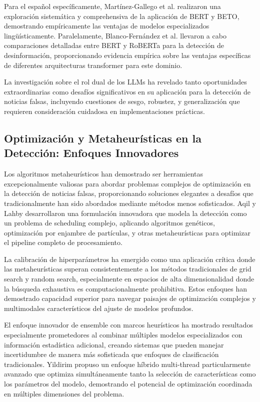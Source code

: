 Para el español específicamente, Martínez-Gallego et al. \cite{martinez2021fake} realizaron una exploración sistemática y comprehensiva de la aplicación de BERT y BETO, demostrando empíricamente las ventajas de modelos especializados lingüísticamente. Paralelamente, Blanco-Fernández et al. \cite{blanco2024enhancing} llevaron a cabo comparaciones detalladas entre BERT y RoBERTa para la detección de desinformación, proporcionando evidencia empírica sobre las ventajas específicas de diferentes arquitecturas transformer para este dominio.

La investigación sobre el rol dual de los LLMs \cite{hu2024bad, su2023adapting, su2023fake} ha revelado tanto oportunidades extraordinarias como desafíos significativos en su aplicación para la detección de noticias falsas, incluyendo cuestiones de sesgo, robustez, y generalización que requieren consideración cuidadosa en implementaciones prácticas.

\subsection{Optimización y Metaheurísticas en la Detección: Enfoques Innovadores}

Los algoritmos metaheurísticos han demostrado ser herramientas excepcionalmente valiosas para abordar problemas complejos de optimización en la detección de noticias falsas, proporcionando soluciones elegantes a desafíos que tradicionalmente han sido abordados mediante métodos menos sofisticados. Aqil y Lahby \cite{aqil2021modeling} desarrollaron una formulación innovadora que modela la detección como un problema de scheduling complejo, aplicando algoritmos genéticos, optimización por enjambre de partículas, y otras metaheurísticas para optimizar el pipeline completo de procesamiento.

La calibración de hiperparámetros \cite{bacanin2023benefits, hurtado2024calibracion} ha emergido como una aplicación crítica donde las metaheurísticas superan consistentemente a los métodos tradicionales de grid search y random search, especialmente en espacios de alta dimensionalidad donde la búsqueda exhaustiva es computacionalmente prohibitiva. Estos enfoques han demostrado capacidad superior para navegar paisajes de optimización complejos y multimodales característicos del ajuste de modelos profundos.

El enfoque innovador de ensemble con marcos heurísticos \cite{das2022heuristic} ha mostrado resultados especialmente prometedores al combinar múltiples modelos especializados con información estadística adicional, creando sistemas que pueden manejar incertidumbre de manera más sofisticada que enfoques de clasificación tradicionales. Yildirim \cite{yildirim2023novel} propuso un enfoque híbrido multi-thread particularmente avanzado que optimiza simultáneamente tanto la selección de características como los parámetros del modelo, demostrando el potencial de optimización coordinada en múltiples dimensiones del problema.

